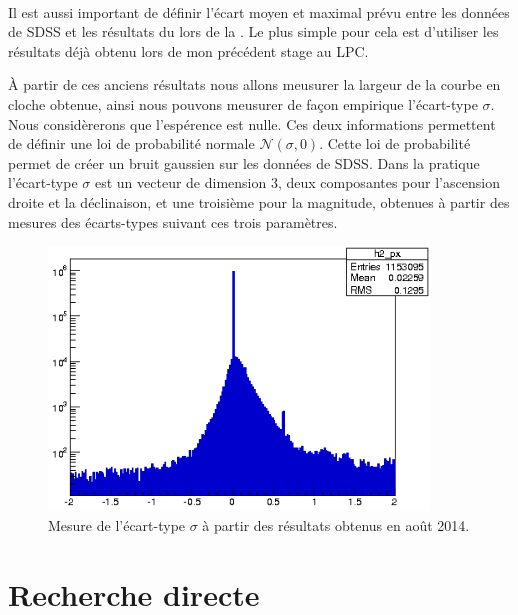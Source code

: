 
\ 

Il est aussi important de définir l'écart moyen et maximal prévu entre les données de SDSS et les résultats du \stack{} lors de la \DC{}. Le plus simple pour cela est d'utiliser les résultats déjà obtenu lors de mon précédent stage au LPC.

À partir de ces anciens résultats nous allons meusurer la largeur de la courbe en cloche obtenue, ainsi nous pouvons meusurer de façon empirique l'écart-type $\sigma$. Nous considèrerons que l'espérence est nulle. Ces deux informations permettent de définir une loi de probabilité normale $\mathcal{N}(\sigma,0)$. Cette loi de probabilité permet de créer un bruit gaussien sur les données de SDSS. Dans la pratique l'écart-type $\sigma$ est un vecteur de dimension 3, deux composantes pour l'ascension droite et la déclinaison, et une troisième pour la magnitude, obtenues à partir des mesures des écarts-types suivant ces trois paramètres.

	\begin{figure}[h]
		\centering
		\includegraphics[width=0.9\textwidth]{img/mesuresigma.png}
		\caption[Mesure de l'écart-type à partir des anciens résultats]{Mesure de l'écart-type $\sigma$ à partir des résultats obtenus en août 2014.}
		\label{fig:mesuresigma}
	\end{figure}


\section{Recherche directe}

